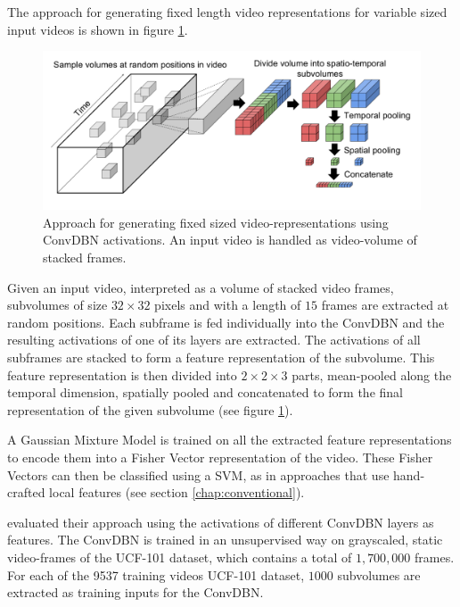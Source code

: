 The approach for generating fixed length video representations for variable sized input videos is shown in figure \ref{fig:palasekpatras_approachschematik}.

\begin{figure}[H]
    \centering
    \includegraphics[width=\textwidth]{img_deep/palasekpatras_approachschematik}
    \caption{Approach for generating fixed sized video-representations using ConvDBN activations. An input video is handled as video-volume of stacked frames. \cite{lee_convolutional_2009-1}}
    \label{fig:palasekpatras_approachschematik}
\end{figure}

Given an input video, interpreted as a volume of stacked video frames, subvolumes of size $32 \times 32$ pixels and with a length of $15$ frames are extracted at random positions.
Each subframe is fed individually into the ConvDBN and the resulting activations of one of its layers are extracted.
The activations of all subframes are stacked to form a feature representation of the subvolume.
This feature representation is then divided into $2 \times 2 \times 3$ parts, mean-pooled along the temporal dimension, spatially pooled and concatenated to form the final representation of the given subvolume (see figure \ref{fig:palasekpatras_approachschematik}). \cite{lee_convolutional_2009-1}

A Gaussian Mixture Model is trained on all the extracted feature representations to encode them into a Fisher Vector representation of the video.
These Fisher Vectors can then be classified using a SVM, as in approaches that use hand-crafted local features (see section \ref{chap:conventional}).
 
\textcite{palasek_action_2016} evaluated their approach using the activations of different ConvDBN layers as features.
The ConvDBN is trained in an unsupervised way on grayscaled, static video-frames of the UCF-101 dataset, which contains a total of $1,700,000$ frames.
For each of the 9537 training videos UCF-101 dataset, $1000$ subvolumes are extracted as training inputs for the ConvDBN.

